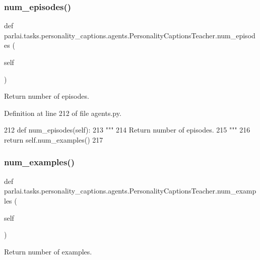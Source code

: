 \subsubsection{\texorpdfstring{num\+\_\+episodes()}{num\_episodes()}}
{\footnotesize\ttfamily def parlai.\+tasks.\+personality\+\_\+captions.\+agents.\+Personality\+Captions\+Teacher.\+num\+\_\+episodes (\begin{DoxyParamCaption}\item[{}]{self }\end{DoxyParamCaption})}

\begin{DoxyVerb}Return number of episodes.
\end{DoxyVerb}
 

Definition at line 212 of file agents.\+py.


\begin{DoxyCode}
212     \textcolor{keyword}{def }num\_episodes(self):
213         \textcolor{stringliteral}{"""}
214 \textcolor{stringliteral}{        Return number of episodes.}
215 \textcolor{stringliteral}{        """}
216         \textcolor{keywordflow}{return} self.num\_examples()
217 
\end{DoxyCode}
\mbox{\label{classparlai_1_1tasks_1_1personality__captions_1_1agents_1_1PersonalityCaptionsTeacher_aa19ecea79bceee398eafd3a903e67349}} 
\subsubsection{\texorpdfstring{num\+\_\+examples()}{num\_examples()}}
{\footnotesize\ttfamily def parlai.\+tasks.\+personality\+\_\+captions.\+agents.\+Personality\+Captions\+Teacher.\+num\+\_\+examples (\begin{DoxyParamCaption}\item[{}]{self }\end{DoxyParamCaption})}

\begin{DoxyVerb}Return number of examples.
\end{DoxyVerb}
 

